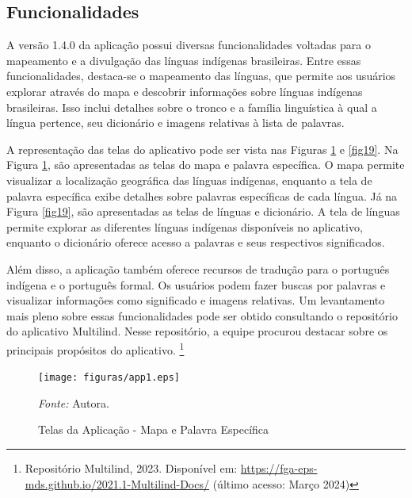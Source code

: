 \subsection{Funcionalidades}
\label{Funcionalidades}
A versão 1.4.0 da aplicação possui diversas funcionalidades voltadas para o mapeamento e a divulgação das línguas indígenas brasileiras. Entre essas funcionalidades, destaca-se o mapeamento das línguas, que permite aos usuários 
explorar através do mapa e descobrir informações sobre línguas indígenas brasileiras. Isso inclui detalhes sobre o tronco e a família linguística à qual a língua pertence, seu dicionário e imagens relativas à lista de palavras.


A representação das telas do aplicativo pode ser vista nas Figuras \ref{fig18} e \ref{fig19}. Na Figura \ref{fig18}, são apresentadas as telas do mapa e palavra específica. O mapa permite visualizar a localização geográfica das 
línguas indígenas, enquanto a tela de palavra específica exibe detalhes sobre palavras específicas de cada língua. Já na Figura \ref{fig19}, são apresentadas as telas de línguas e dicionário. A tela de línguas permite explorar 
as diferentes línguas indígenas disponíveis no aplicativo, enquanto o dicionário oferece acesso a palavras e seus respectivos significados. 

Além disso, a aplicação também oferece recursos de tradução para o português indígena e o português formal. Os usuários podem fazer buscas por palavras e visualizar informações como significado e imagens relativas. Um levantamento 
mais pleno sobre essas funcionalidades pode ser obtido consultando o repositório do aplicativo Multilind. Nesse repositório, a equipe procurou destacar sobre os principais propósitos do aplicativo. \footnote{Repositório Multilind, 2023. Disponível
em: \url{https://fga-eps-mds.github.io/2021.1-Multilind-Docs/} (último acesso: Março 2024)}

\begin{figure}[h!]
	\centering
	\caption{Telas da Aplicação - Mapa e Palavra Específica}
	\begin{adjustbox}{center}
		\texttt{[image: figuras/app1.eps]}
	\end{adjustbox}
	\begin{tablenotes}[flushleft]
		\centering
		\item \textit{Fonte:} Autora.
	\end{tablenotes}
	\label{fig18}
\end{figure}

\newpage

